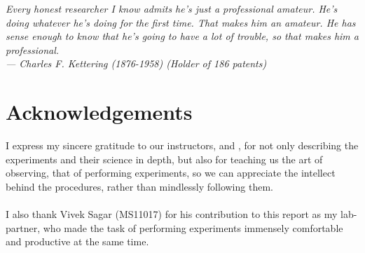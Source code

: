 
\begin{flushright}{\slshape    
Every honest researcher I know admits he's just a professional amateur.
He's doing whatever he's doing for the first time. That makes him an amateur.
He has sense enough to know that he's going to have a lot of trouble,
so that makes him a professional.\\ \medskip
--- Charles F. Kettering (1876-1958) (Holder of 186 patents)}
\end{flushright}



\bigskip

\begingroup
\let\clearpage\relax
\let\cleardoublepage\relax
\let\cleardoublepage\relax
\chapter*{Acknowledgements}
I express my sincere gratitude to our instructors, \myProf and \myOtherProf, for not only describing the experiments and their science in depth, but also for teaching us the art of observing, that of performing experiments, so we can appreciate the intellect behind the procedures, rather than mindlessly following them.\\
 \\
I also thank Vivek Sagar (MS11017) for his contribution to this report as my lab-partner, who made the task of performing experiments immensely comfortable and productive at the same time.\\
\bigskip


\endgroup




